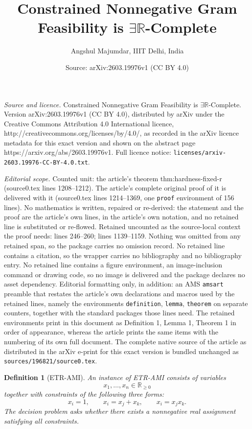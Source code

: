 \documentclass[10pt,a4paper]{amsart}
\title{Constrained Nonnegative Gram Feasibility is $\exists\mathbb{R}$-Complete}
\author{Angshul Majumdar, IIIT Delhi, India}
\date{Source: arXiv:2603.19976v1 (CC BY 4.0)}
\newtheorem{definition}{Definition}
\begin{document}
\maketitle

\noindent\emph{Source and licence.} Constrained Nonnegative Gram Feasibility is $\exists\mathbb{R}$-Complete. Version arXiv:2603.19976v1 (CC BY 4.0), distributed by arXiv under the Creative Commons Attribution 4.0 International licence, http://creativecommons.org/licenses/by/4.0/, as recorded in the arXiv licence metadata for this exact version and shown on the abstract page https://arxiv.org/abs/2603.19976v1. Full licence notice: \texttt{licenses/arxiv-2603.19976-CC-BY-4.0.txt}.\par\smallskip

\noindent\textit{Editorial scope.} Counted unit: the article's theorem thm:hardness-fixed-r (source0.tex lines 1208--1212). The article's complete original proof of it is delivered with it (source0.tex lines 1214--1369, one \texttt{proof} environment of 156 lines). No mathematics is written, repaired or re-derived: the statement and the proof are the article's own lines, in the article's own notation, and no retained line is substituted or re-flowed.  Retained uncounted as the source-local context the proof needs: lines 246--260; lines 1139--1159.  Nothing was omitted from any retained span, so the package carries no omission record.  No retained line contains a citation, so the wrapper carries no bibliography and no bibliography entry.  No retained line contains a figure environment, an image-inclusion command or drawing code, so no image is delivered and the package declares no asset dependency.  Editorial formatting only, in addition: an AMS \texttt{amsart} preamble that restates the article's own declarations and macros used by the retained lines, namely the environments \texttt{definition}, \texttt{lemma}, \texttt{theorem} on separate counters, together with the standard packages those lines need.  The retained environments print in this document as Definition 1, Lemma 1, Theorem 1 in order of appearance, whereas the article prints the same items with the numbering of its own full document.  The complete native source of the article as distributed in the arXiv e-print for this exact version is bundled unchanged as \texttt{sources/196821/source0.tex}.
\begin{definition}[ETR-AMI]
\label{def:etrami}
An instance of \textsc{ETR-AMI} consists of variables
\[
x_1,\dots,x_n \in \mathbb{R}_{\ge 0}
\]
together with constraints of the following three forms:
\[
x_i = 1,\qquad
x_i = x_j + x_k,\qquad
x_i = x_j x_k.
\]
The decision problem asks whether there exists a nonnegative real assignment
satisfying all constraints.
\end{definition}
\end{document}
